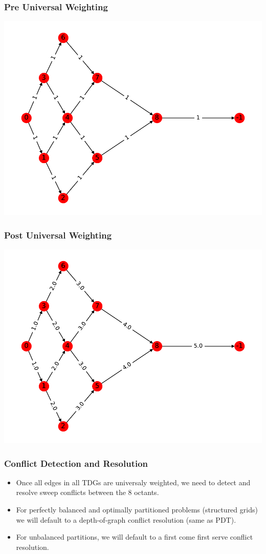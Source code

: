 \documentclass[xcolor={usenames,dvipsnames,svgnames,table}]{beamer}
\begin{document}
\begin{frame}[t]\frametitle{Pre Universal Weighting}
  \centering
  \includegraphics[scale=0.65]{figures/G_pre_universal.pdf}
\end{frame}

\begin{frame}[t]\frametitle{Post Universal Weighting}
  \centering
  \includegraphics[scale=0.65]{figures/G_universal.pdf}
\end{frame}


\begin{frame}[t]\frametitle{Conflict Detection and Resolution}
\begin{block}{}
\begin{itemize}
	\item Once all edges in all TDGs are universaly weighted, we need to detect and resolve sweep conflicts between the 8 octants.
	\item For perfectly balanced and optimally partitioned problems (structured grids) we will default to a depth-of-graph conflict resolution (same as PDT).
	\item For unbalanced partitions, we will default to a first come first serve conflict resolution.
\end{itemize}
\end{block}
\end{frame}
\end{document}

